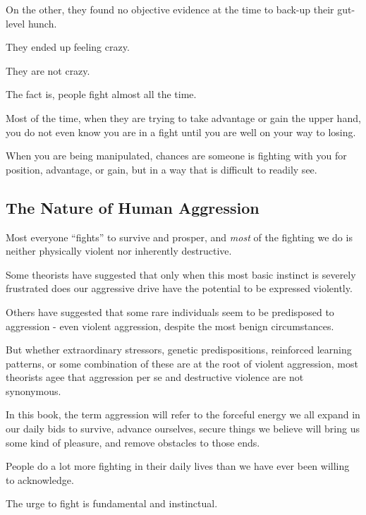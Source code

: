 \documentclass[oneside]{book}
\numberwithin{equation}{section}
\begin{document}
On the other, they found no objective evidence at the time to back-up their gut-level hunch.

They ended up feeling crazy.

%
They are not crazy.

The fact is, people fight almost all the time.


Most of the time, when they are trying to take advantage or gain the upper hand, you do not even know you are in a fight until you are well on your way to losing.

When you are being manipulated, chances are someone is fighting with you for position, advantage, or gain, but in a way that is difficult to readily see.


\subsection*{The Nature of Human Aggression}

Most everyone ``fights'' to survive and prosper, and \textit{most} of the fighting we do is neither physically violent nor inherently destructive.

Some theorists have suggested that only when this most basic instinct is severely frustrated does our aggressive drive have the potential to be expressed violently.

Others have suggested that some rare individuals seem to be predisposed to aggression - even violent aggression, despite the most benign circumstances.

But whether extraordinary stressors, genetic predispositions, reinforced learning patterns, or some combination of these are at the root of violent aggression, most theorists agee that aggression per se and destructive violence are not synonymous.

In this book, the term aggression will refer to the forceful energy we all expand in our daily bids to survive, advance ourselves, secure things we believe will bring us some kind of pleasure, and remove obstacles to those ends.

%
People do a lot more fighting in their daily lives than we have ever been willing to acknowledge.

The urge to fight is fundamental and instinctual.
\end{document}
